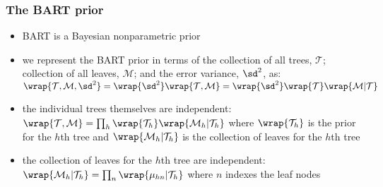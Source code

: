 \documentclass[11pt,dvipsnames,usenames,times]{beamer}
\begin{document}
\begin{frame}[fragile]
\frametitle{The BART prior}
\begin{itemize}
\item BART is a Bayesian nonparametric prior
\item we represent the BART prior in terms
of the collection of all trees, $\mathcal{T}$; collection of all leaves,
$\mathcal{M}$; and the error variance, $\sd^2$, as: 
 $\wrap{\mathcal{T}, \mathcal{M}, \sd^2}=
\wrap{\sd^2}\wrap{\mathcal{T}, \mathcal{M}}=
\wrap{\sd^2}\wrap{\mathcal{T}}\wrap{\mathcal{M}|\mathcal{T}}$
\item the individual trees themselves are independent:
$\wrap{\mathcal{T}, \mathcal{M}}=\prod_h
\wrap{\mathcal{T}_h}\wrap{\mathcal{M}_h|\mathcal{T}_h}$
where $\wrap{\mathcal{T}_h}$ is the prior for the $h$th tree and
$\wrap{\mathcal{M}_h|\mathcal{T}_h}$ is the collection of leaves for
the $h$th tree
\item the collection of leaves for the
$h$th tree are independent:
$\wrap{\mathcal{M}_h|\mathcal{T}_h}=
\prod_n\wrap{\mu_{hn}|\mathcal{T}_h}$
where $n$ indexes the leaf nodes
\end{itemize}
\end{frame}
\end{document}
